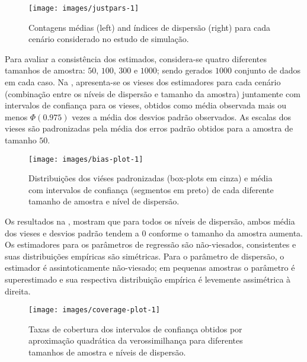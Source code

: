 \documentclass[
    oldfontcommands,
    11pt,
    openright,
    twoside,
    a4paper,
    english,
    brazil
]{abntex2}\usepackage[]{graphicx}\usepackage[]{color}
\begin{document}
\begin{figure}[!htb]

{\centering \texttt{[image: images/justpars-1]} 

}

\caption[Contagens médias (left) and índices de dispersão (right) para cada cenário considerado no estudo de simulação]{Contagens médias (left) and índices de dispersão (right) para cada cenário considerado no estudo de simulação.}\label{fig:justpars}
\end{figure}



Para avaliar a consistência dos estimados, considera-se quatro
diferentes tamanhos de amostra: $50$, $100$, $300$ e $1000$; sendo
gerados $1000$ conjunto de dados em cada caso. Na ,
apresenta-se os vieses dos estimadores para cada cenário (combinação
entre os níveis de dispersão e tamanho da amostra) juntamente com
intervalos de confiança para os vieses, obtidos como média observada
mais ou menos $\Phi(0.975)$ vezes a média dos desvios padrão
observados. As escalas dos vieses são padronizadas pela média dos erros
padrão obtidos para a amostra de tamanho $50$.

\begin{figure}[!htb]

{\centering \texttt{[image: images/bias-plot-1]} 

}

\caption[Distribuições dos viéses padronizadas (box-plots em cinza) e média com intervalos de confiança (segmentos em preto) de cada diferente tamanho de amostra e nível de dispersão]{Distribuições dos viéses padronizadas (box-plots em cinza) e média com intervalos de confiança (segmentos em preto) de cada diferente tamanho de amostra e nível de dispersão.}\label{fig:bias-plot}
\end{figure}



Os resultados na , mostram que para todos os níveis
de dispersão, ambos média dos vieses e desvios padrão tendem a $0$
conforme o tamanho da amostra aumenta. Os estimadores para os parâmetros
de regressão são não-viesados, consistentes e suas distribuições
empíricas são simétricas. Para o parâmetro de dispersão, o estimador é
assintoticamente não-viesado; em pequenas amostras o parâmetro é
superestimado e sua respectiva distribuição empírica é levemente
assimétrica à direita.

\begin{figure}[!htb]

{\centering \texttt{[image: images/coverage-plot-1]} 

}

\caption[Taxas de cobertura dos intervalos de confiança obtidos por aproximação quadrática da verossimilhança para diferentes tamanhos de amostra e níveis de dispersão]{Taxas de cobertura dos intervalos de confiança obtidos por aproximação quadrática da verossimilhança para diferentes tamanhos de amostra e níveis de dispersão.}\label{fig:coverage-plot}
\end{figure}
\end{document}
